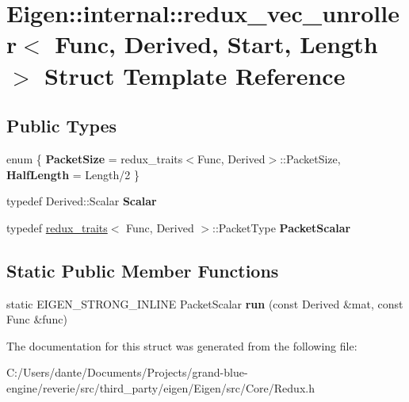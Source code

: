 \hypertarget{struct_eigen_1_1internal_1_1redux__vec__unroller}{}\section{Eigen\+::internal\+::redux\+\_\+vec\+\_\+unroller$<$ Func, Derived, Start, Length $>$ Struct Template Reference}
\label{struct_eigen_1_1internal_1_1redux__vec__unroller}
\subsection*{Public Types}
\begin{DoxyCompactItemize}
\item 
\mbox{\label{struct_eigen_1_1internal_1_1redux__vec__unroller_a799c40a455137f96214a5353c3b017e7}} 
enum \{ {\bfseries Packet\+Size} = redux\+\_\+traits$<$Func, Derived$>$\+::Packet\+Size, 
{\bfseries Half\+Length} = Length/2
 \}
\item 
\mbox{\label{struct_eigen_1_1internal_1_1redux__vec__unroller_a37caf247b75c895c88df3d44bf97bab5}} 
typedef Derived\+::\+Scalar {\bfseries Scalar}
\item 
\mbox{\label{struct_eigen_1_1internal_1_1redux__vec__unroller_a983568f8988c5c8891f9febfbe5e8722}} 
typedef \mbox{\hyperlink{struct_eigen_1_1internal_1_1redux__traits}{redux\+\_\+traits}}$<$ Func, Derived $>$\+::Packet\+Type {\bfseries Packet\+Scalar}
\end{DoxyCompactItemize}
\subsection*{Static Public Member Functions}
\begin{DoxyCompactItemize}
\item 
\mbox{\label{struct_eigen_1_1internal_1_1redux__vec__unroller_aa41cff18de625592df82c377cd67d916}} 
static E\+I\+G\+E\+N\+\_\+\+S\+T\+R\+O\+N\+G\+\_\+\+I\+N\+L\+I\+NE Packet\+Scalar {\bfseries run} (const Derived \&mat, const Func \&func)
\end{DoxyCompactItemize}


The documentation for this struct was generated from the following file\+:\begin{DoxyCompactItemize}
\item 
C\+:/\+Users/dante/\+Documents/\+Projects/grand-\/blue-\/engine/reverie/src/third\+\_\+party/eigen/\+Eigen/src/\+Core/Redux.\+h\end{DoxyCompactItemize}
